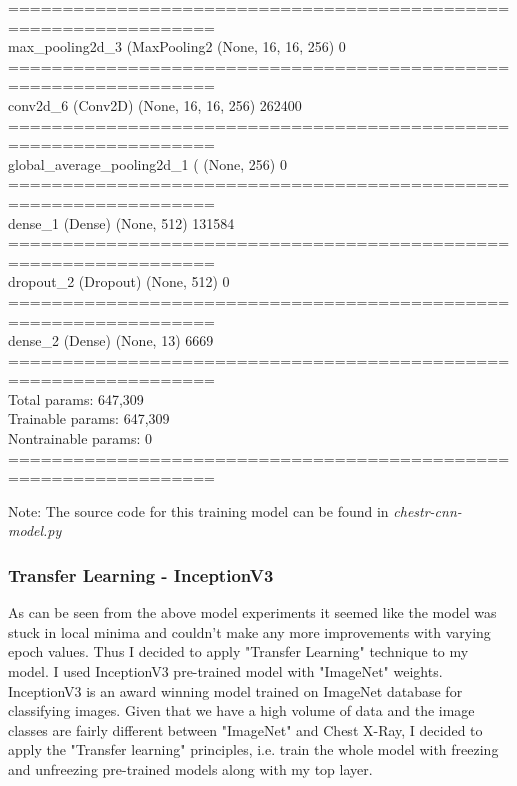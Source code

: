 \documentclass{article}
\begin{document}
{\begin{minipage}{\textwidth}
        =================================================================  \\ 
        max\_pooling2d\_3 (MaxPooling2 (None, 16, 16, 256)       0  \\ 
        =================================================================  \\ 
        conv2d\_6 (Conv2D)            (None, 16, 16, 256)       262400  \\ 
        =================================================================  \\ 
        global\_average\_pooling2d\_1 ( (None, 256)               0  \\ 
        =================================================================  \\ 
        dense\_1 (Dense)              (None, 512)               131584  \\ 
        =================================================================  \\ 
        dropout\_2 (Dropout)          (None, 512)               0  \\ 
        =================================================================  \\ 
        dense\_2 (Dense)              (None, 13)                6669  \\ 
        =================================================================  \\ 
        Total params: 647,309  \\ 
        Trainable params: 647,309  \\ 
        Nontrainable params: 0  \\ 
        =================================================================
    \end{minipage}}
    
    

    Note: The source code for this training model can be found in \textit{chestr-cnn-model.py}\cite{github-proj}

    \subsubsection{Transfer Learning - InceptionV3}  
    As can be seen from the above model experiments it seemed like the model was stuck in local minima and couldn't make any more improvements with varying epoch values. Thus I decided to apply "Transfer Learning" technique to my model. I used InceptionV3 pre-trained model with "ImageNet" weights. InceptionV3 is an award winning model trained on ImageNet database for classifying images. Given that we have a high volume of data and the image classes are fairly different between "ImageNet" and Chest X-Ray, I decided to apply the "Transfer learning" principles, i.e. train the whole model with freezing and unfreezing pre-trained models along with my top layer. 
\end{document}
